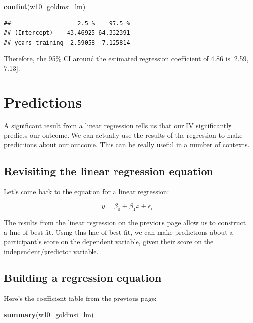 \documentclass[
]{book}
\newenvironment{Shaded}{\begin{snugshade}}{\end{snugshade}}
\newcommand{\FunctionTok}[1]{\textcolor[rgb]{0.13,0.29,0.53}{\textbf{#1}}}
\newcommand{\NormalTok}[1]{#1}
\begin{document}
\begin{Shaded}
\begin{Highlighting}[]
\FunctionTok{confint}\NormalTok{(w10\_goldmsi\_lm)}
\end{Highlighting}
\end{Shaded}

\begin{verbatim}
##                   2.5 %    97.5 %
## (Intercept)    43.46925 64.332391
## years_training  2.59058  7.125814
\end{verbatim}

Therefore, the 95\% CI around the estimated regression coefficient of 4.86 is {[}2.59, 7.13{]}.

\section{Predictions}\label{predictions}

A significant result from a linear regression tells us that our IV significantly predicts our outcome. We can actually use the results of the regression to make predictions about our outcome. This can be really useful in a number of contexts.

\subsection{Revisiting the linear regression equation}\label{revisiting-the-linear-regression-equation}

Let's come back to the equation for a linear regression:

\[
y = \beta_0 + \beta_1x + \epsilon_i
\]

The results from the linear regression on the previous page allow us to construct a line of best fit. Using this line of best fit, we can make predictions about a participant's score on the dependent variable, given their score on the independent/predictor variable.

\subsection{Building a regression equation}\label{building-a-regression-equation}

Here's the coefficient table from the previous page:

\begin{Shaded}
\begin{Highlighting}[]
\FunctionTok{summary}\NormalTok{(w10\_goldmsi\_lm)}
\end{Highlighting}
\end{Shaded}
\end{document}
